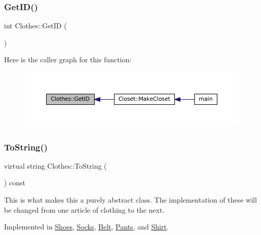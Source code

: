 \subsubsection{\texorpdfstring{Get\+I\+D()}{GetID()}}
{\footnotesize\ttfamily int Clothes\+::\+Get\+ID (\begin{DoxyParamCaption}{ }\end{DoxyParamCaption})\hspace{0.3cm}{\ttfamily [inline]}}

Here is the caller graph for this function\+:
\nopagebreak
\begin{figure}[H]
\begin{center}
\leavevmode
\includegraphics[width=350pt]{classClothes_a3f6dac172f333126d19010f85ec44e4c_icgraph}
\end{center}
\end{figure}
\mbox{\label{classClothes_a953d143394e9a2c007ab0c3a638973cf}} 
\subsubsection{\texorpdfstring{To\+String()}{ToString()}}
{\footnotesize\ttfamily virtual string Clothes\+::\+To\+String (\begin{DoxyParamCaption}{ }\end{DoxyParamCaption}) const\hspace{0.3cm}{\ttfamily [pure virtual]}}

This is what makes this a purely abstract class. The implementation of these will be changed from one article of clothing to the next. 

Implemented in \mbox{\hyperlink{classShoes_a9b1bcc00ec7ef920d34bf9193c96a1ce}{Shoes}}, \mbox{\hyperlink{classSocks_aad237fbcc4ccf36a2956fcdef8760683}{Socks}}, \mbox{\hyperlink{classBelt_af09e2b5e51b7603ec5dede2e6b0a753f}{Belt}}, \mbox{\hyperlink{classPants_a9b5fcde766a77877bf428e18c65f1e70}{Pants}}, and \mbox{\hyperlink{classShirt_ab85aaa20a603d63f4144d1b42d9b616d}{Shirt}}.



